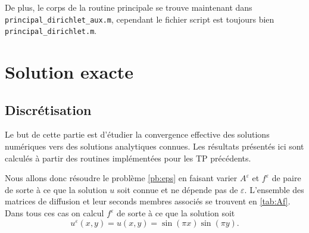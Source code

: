 \documentclass[11pt]{article}
\begin{document}
De plus, le corps de la routine principale se trouve maintenant dans \texttt{principal\_dirichlet\_aux.m}, cependant le fichier script est toujours bien
\texttt{principal\_dirichlet.m}.

\section{Solution exacte}

\subsection{Discrétisation}

Le but de cette partie est d'étudier la convergence effective des solutions numériques vers des solutions analytiques connues. Les résultats présentés ici sont
calculés à partir des routines implémentées pour les TP précédents.

Nous allons donc résoudre le problème \ref{pb:eps} en faisant varier $A^\varepsilon$ et $f^\varepsilon$ de paire de sorte à ce que la solution $u$ soit connue et
ne dépende pas de $\varepsilon$. L'ensemble des matrices de diffusion et leur seconds membres associés se trouvent en \autoref{tab:Af}. Dans tous ces cas on
calcul $f^\varepsilon$ de sorte à ce que la solution soit
\[
  u^\varepsilon(x, y) = u(x, y) = \sin(\pi x)\sin(\pi y).
\]
\end{document}
